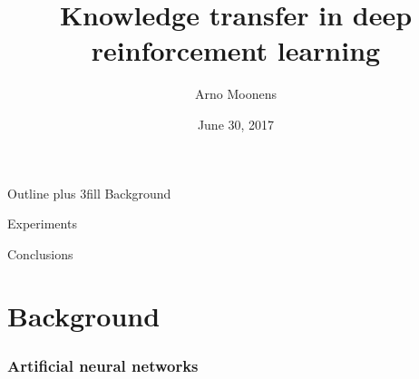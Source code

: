 \documentclass{beamer}
\title{Knowledge transfer in deep reinforcement learning}
\author{Arno Moonens}
\date{June 30, 2017}
\begin{document}
\frame{\titlepage}

\begin{frame}{Outline}
    \vskip0pt plus 3fill
  {\color{vubbleu}\large Background}
  \tableofcontents[part=1]

  {\color{vubbleu}\large Experiments}
  \tableofcontents[part=2]

  {\color{vubbleu}\large Conclusions}
  \tableofcontents[part=3]
\end{frame}

\part{Background}

\section{Artificial neural networks}
\end{document}

